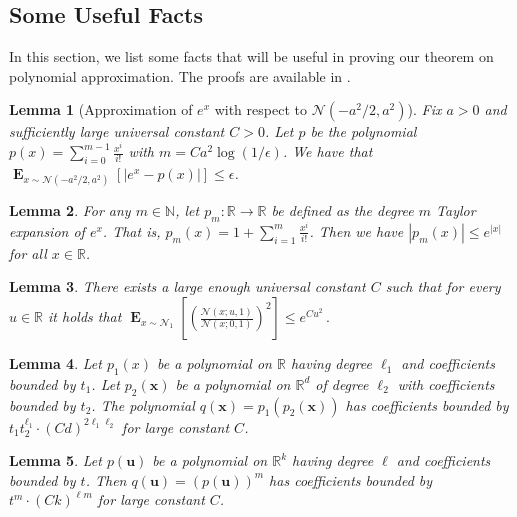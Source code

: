 \documentclass[10pt,a4paper]{article}
\newtheorem{lemma}{Lemma}[section]
\renewcommand\vec[1]{\mathbf{#1}}
\DeclareMathOperator*{\E}{\mathbf{E}}
\newcommand{\normal}{\mathcal{N}}
\newcommand{\R}{\mathbb{R}}
\newcommand{\N}{\mathbb{N}}
\newcommand{\1}{\Ind}
\newcommand{\x}{\vec x}
\newcommand{\vu}{\vec u}
\newcommand{\Gauss}{\mathcal{N}}
\begin{document}
\subsection{Some Useful Facts}
\label{subsec:facts}
In this section, we list some facts that will be useful in proving our theorem on polynomial approximation. The proofs are available in .
\begin{lemma}[Approximation of $e^x$ with respect to $\normal(-a^2/2, a^2)$]
\label{claim:approx_exp_pdf_taylor}
Fix $a>0$ and sufficiently large universal constant $C>0$.
Let $p$ be the polynomial $p(x)=\sum_{i=0}^{m-1}\frac{x^{i}}{i!}$ with $m = Ca^2\log(1/\epsilon)$. 
We have that  $\E_{x\sim \normal(-a^2/2,a^2)}[|e^x-p(x)|]\leq \epsilon$.
\end{lemma}
\begin{lemma}
    \label{taylor_exp_under}
 For any $m\in \N$, let $p_m:\R\to \R$ be defined as the degree $m$ Taylor expansion of $e^x$. That is, $p_m(x)=1+\sum_{i=1}^{m}\frac{x^i}{i!}$. Then we have $|p_m(x)|\leq e^{|x|}$ for all $x\in \R$.
\end{lemma}
 \begin{lemma} There exists a large enough universal constant $C$ such that for every $u\in \R$ it holds that
    \label{lemma:ratio_subgaussian}
    \(
    \E_{x\sim \Gauss_1}\left[\left(\frac{\Gauss(x;u,1)}{\Gauss(x;0,1)}\right)^2\right]\leq   e^{{Cu^2}} \,.
    \)
\end{lemma}
  \begin{lemma}
    \label{lem:coeff_bound_comp}
    Let $p_1(x)$ be a polynomial on $\R$ having degree $\ell_1$ and coefficients bounded by $t_1$. Let $p_2(\x)$ be a polynomial on $\R^{d}$ of degree $\ell_2$ with coefficients bounded by $t_2$. The polynomial $q(\x)=p_1(p_2(\x))$ has coefficients bounded by $t_1t_2^{\ell_1}\cdot (Cd)^{2\ell_1 \ell_2}$ for large constant $C$.
\end{lemma}
\begin{lemma}
    \label{lem:coeff_bound_powering}
    Let $p(\vu)$ be a polynomial on $\R^k$ having degree $\ell$ and coefficients bounded by $t$. Then $q(\vu)=(p(\vu))^{m}$ has coefficients bounded by $t^m\cdot (Ck)^{\ell m}$ for large constant $C$.
\end{lemma}
\end{document}
